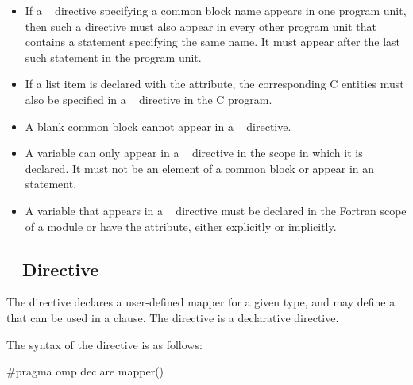 \begin{fortranspecific}
\begin{itemize}
\item If a ~ directive specifying a common
      block name appears in one program unit, then such a directive must
      also appear in every other program unit that contains a 
      statement specifying the same name. It must appear after the last
      such  statement in the program unit.

\item If a list item is declared with the  attribute, the
      corresponding C entities must also be specified in a
      ~ directive in the C program.

\item A blank common block cannot appear in a ~
      directive.

\item A variable can only appear in a ~ directive
      in the scope in which it is declared. It must not be an element of a
      common block or appear in an  statement.

\item A variable that appears in a ~ directive
      must be declared in the Fortran scope of a module or have the
       attribute, either explicitly or implicitly.
\end{itemize}
\end{fortranspecific}


\subsection{~ Directive}
\label{subsec:declare mapper Directive}

\summary

The  directive declares a user-defined mapper for a given
type, and may define a  that can be used in a 
clause. The  directive is a declarative directive.

\syntax
\begin{ccppspecific}
The syntax of the  directive is as follows:

\begin{ompcPragma}
#pragma omp declare mapper()
\end{ompcPragma}

\end{ccppspecific}


